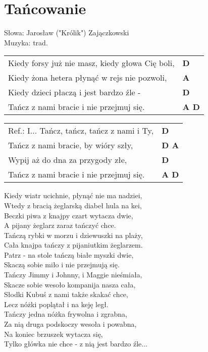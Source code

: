 \section{Tańcowanie}

Słowa: Jarosław ("Królik") Zajączkowski\\
Muzyka:  trad.

\vspace{2em}
\begin{tabular}{@{}p{9cm}@{}l@{}}
Kiedy forsy już nie masz, kiedy głowa Cię boli, & \bfseries   D \\
Kiedy żona hetera płynąć w rejs nie pozwoli, & \bfseries   A \\
Kiedy dzieci płaczą i jest bardzo źle - & \bfseries  D \\
Tańcz z nami bracie i nie przejmuj się. & \bfseries  A D \\
\end{tabular}

\vspace{1em}
\begin{tabular}{@{}p{9cm}@{}l@{}}
Ref.: I...  Tańcz, tańcz, tańcz z nami i Ty, & \bfseries  D \\
Tańcz z nami bracie, by wióry szły, & \bfseries  D A \\
Wypij aż do dna za przygody złe, & \bfseries  D \\
Tańcz z nami bracie i nie przejmuj się. & \bfseries   A D \\
\end{tabular}

\vspace{1em}
Kiedy wiatr ucichnie, płynąć nie ma nadziei, \\
Wtedy z bracią żeglarską diabeł hula na kei, \\
Beczki piwa z knajpy czart wytacza dwie, \\
A pijany żeglarz zaraz tańczyć chce. \\

\vspace{-1em}
Tańczą rybki w morzu i dziewuszki na plaży, \\
Cała knajpa tańczy z pijaniutkim żeglarzem. \\
Patrz - na stole tańczą białe myszki dwie, \\
Skaczą sobie miło i nie przejmują się. \\

Tańczy Jimmy i Johnny, i Maggie nieśmiała, \\
Skacze sobie wesoło kompanija nasza cała, \\
Słodki Kubuś z nami także skakać chce, \\
Lecz nóżki poplątał i na keję legł. \\

Tańczy jedna nóżka frywolna i zgrabna, \\
Za nią druga podskoczy wesoła i powabna, \\
Na koniec brzuszek wytacza się, \\
Tylko główka nie chce - z nią jest bardzo źle...